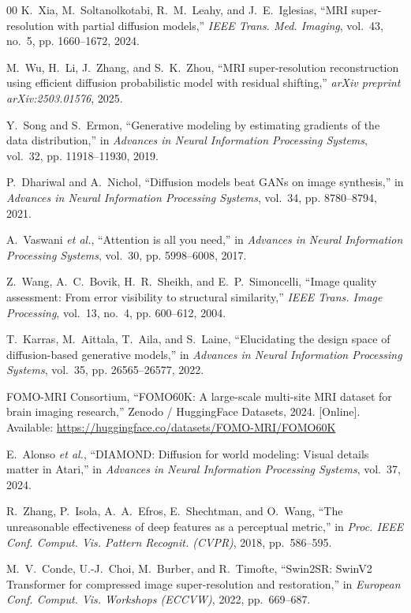\documentclass[10pt,journal]{IEEEtran}
\begin{document}
\begin{thebibliography}{00}
K.~Xia, M.~Soltanolkotabi, R.~M.~Leahy, and J.~E.~Iglesias,
``MRI super-resolution with partial diffusion models,'' \emph{IEEE
Trans. Med. Imaging}, vol.~43, no.~5, pp. 1660--1672, 2024.

M.~Wu, H.~Li, J.~Zhang, and S.~K.~Zhou, ``MRI super-resolution
reconstruction using efficient diffusion probabilistic model with
residual shifting,'' \emph{arXiv preprint arXiv:2503.01576}, 2025.

Y.~Song and S.~Ermon, ``Generative modeling by estimating gradients
of the data distribution,'' in \emph{Advances in Neural Information
Processing Systems}, vol.~32, pp. 11918--11930, 2019.

P.~Dhariwal and A.~Nichol, ``Diffusion models beat GANs on image
synthesis,'' in \emph{Advances in Neural Information Processing
Systems}, vol.~34, pp. 8780--8794, 2021.

A.~Vaswani \emph{et al.}, ``Attention is all you need,'' in
\emph{Advances in Neural Information Processing Systems}, vol.~30,
pp. 5998--6008, 2017.

Z.~Wang, A.~C.~Bovik, H.~R.~Sheikh, and E.~P.~Simoncelli, ``Image
quality assessment: From error visibility to structural similarity,''
\emph{IEEE Trans. Image Processing}, vol.~13, no.~4, pp. 600--612,
2004.

T.~Karras, M.~Aittala, T.~Aila, and S.~Laine, ``Elucidating the
design space of diffusion-based generative models,'' in \emph{Advances
in Neural Information Processing Systems}, vol.~35,
pp. 26565--26577, 2022.

{FOMO-MRI Consortium}, ``FOMO60K: A large-scale multi-site MRI
dataset for brain imaging research,'' Zenodo / HuggingFace Datasets,
2024. [Online]. Available:
\url{https://huggingface.co/datasets/FOMO-MRI/FOMO60K}

E.~Alonso \emph{et al.}, ``DIAMOND: Diffusion for world modeling:
Visual details matter in Atari,'' in \emph{Advances in Neural
Information Processing Systems}, vol.~37, 2024.

R.~Zhang, P.~Isola, A.~A.~Efros, E.~Shechtman, and O.~Wang,
``The unreasonable effectiveness of deep features as a perceptual
metric,'' in \emph{Proc. IEEE Conf. Comput. Vis. Pattern Recognit.
(CVPR)}, 2018, pp.~586--595.

M.~V.~Conde, U.-J.~Choi, M.~Burber, and R.~Timofte,
``Swin2SR: SwinV2 Transformer for compressed image
super-resolution and restoration,'' in \emph{European Conf. Comput.
Vis. Workshops (ECCVW)}, 2022, pp.~669--687.

\end{thebibliography}
\end{document}
